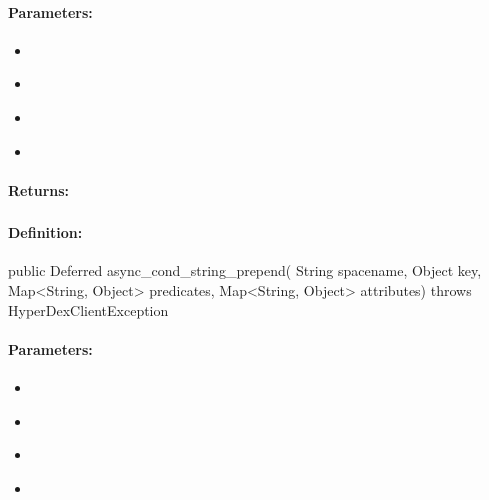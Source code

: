 \paragraph{Parameters:}
\begin{itemize}[noitemsep]
\item {}\\

\item {}\\

\item {}\\

\item {}\\

\end{itemize}

\paragraph{Returns:}


\pagebreak
\subsubsection{}
\label{api:java:async_cond_string_prepend}


\paragraph{Definition:}
\begin{javacode}
public Deferred async_cond_string_prepend(
        String spacename,
        Object key,
        Map<String, Object> predicates,
        Map<String, Object> attributes) throws HyperDexClientException
\end{javacode}

\paragraph{Parameters:}
\begin{itemize}[noitemsep]
\item {}\\

\item {}\\

\item {}\\

\item {}\\

\end{itemize}

